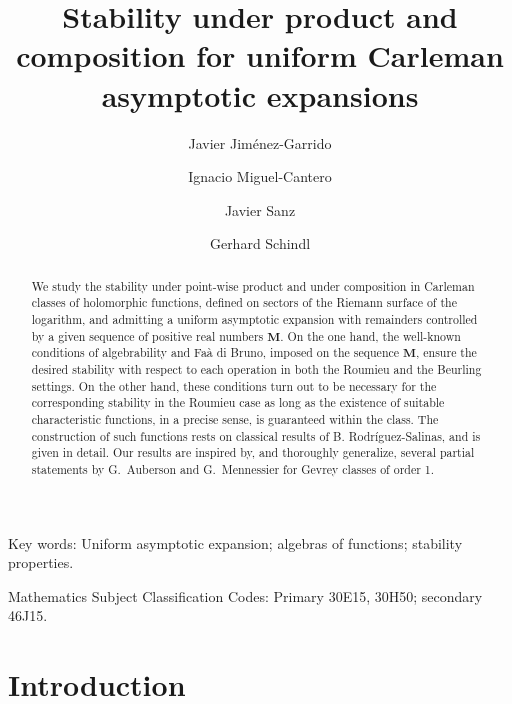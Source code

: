 \documentclass[11pt,a4paper]{article}
\theoremstyle{plain}
\theoremstyle{definition}
\newcommand{\M}{\mathbf{M}}
\begin{document}
\title{Stability under product and composition for uniform Carleman asymptotic expansions}
\author{Javier Jiménez-Garrido \and Ignacio Miguel-Cantero \and Javier Sanz \and Gerhard Schindl}

\maketitle

\begin{abstract}
We study the stability under point-wise product and under composition in Carleman classes of holomorphic functions, defined on sectors of the Riemann surface of the logarithm, and admitting a uniform asymptotic expansion with remainders controlled by a given sequence of positive real numbers $\M$. On the one hand, the well-known conditions of algebrability and Fa\`a di Bruno, imposed on the sequence $\M$, ensure the desired stability with respect to each operation in both the Roumieu and the Beurling settings. On the other hand, these conditions turn out to be necessary for the corresponding stability in the Roumieu case as long as the existence of suitable characteristic functions, in a precise sense, is guaranteed within the class. The construction of such functions rests on classical results of B. Rodríguez-Salinas, and is given in detail. Our results are inspired by, and thoroughly generalize, several partial statements by G.~Auberson and G.~Mennessier for Gevrey classes of order 1. 
\end{abstract}

\par\medskip

\noindent Key words: Uniform asymptotic expansion; algebras of functions; stability properties.
\par
\medskip
{} Mathematics Subject Classification Codes: Primary 30E15, 30H50; secondary  46J15.



\section{Introduction}
\end{document}
